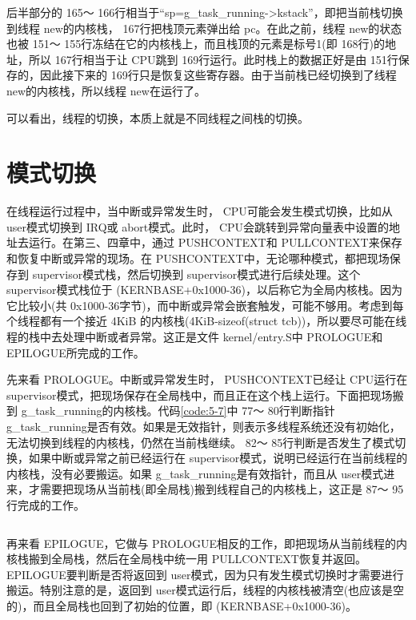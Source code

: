 \documentclass[main.tex]{subfiles}
\begin{document}
\begin{CJK*}{UTF8}{song}
后半部分的 165～ 166行相当于“sp=g\_\-task\_\-running-\textgreater kstack”，即把当前栈切换到线程 new的内核栈， 167行把栈顶元素弹出给 pc。在此之前，线程 new的状态也被 151～ 155行冻结在它的内核栈上，而且栈顶的元素是标号1(即 168行)的地址，所以 167行相当于让 CPU跳到 169行运行。此时栈上的数据正好是由 151行保存的，因此接下来的 169行只是恢复这些寄存器。由于当前栈已经切换到了线程 new的内核栈，所以线程 new在运行了。

\par
可以看出，线程的切换，本质上就是不同线程之间栈的切换。

\section{模式切换}
在线程运行过程中，当中断或异常发生时， CPU可能会发生模式切换，比如从 user模式切换到 IRQ或 abort模式。此时， CPU会跳转到异常向量表中设置的地址去运行。在第三、四章中，通过 PUSH\-CONTEXT和  PULL\-CONTEXT来保存和恢复中断或异常的现场。在 PUSH\-CONTEXT中，无论哪种模式，都把现场保存到 supervisor模式栈，然后切换到 supervisor模式进行后续处理。这个 supervisor模式栈位于 (KERN\-BASE+0x1000-36)，以后称它为全局内核栈。因为它比较小(共 0x1000-36字节)，而中断或异常会嵌套触发，可能不够用。考虑到每个线程都有一个接近 4\-KiB 的内核栈(4\-KiB-sizeof(struct tcb))，所以要尽可能在线程的栈中去处理中断或者异常。这正是文件 kernel\-/\-entry.S中 PROLOGUE和 EPILOGUE所完成的工作。

\par
先来看 PROLOGUE。中断或异常发生时， PUSH\-CONTEXT已经让 CPU运行在 supervisor模式，把现场保存在全局栈中，而且正在这个栈上运行。下面把现场搬到  g\_\-task\_\-running的内核栈。代码\ref{code:5-7}中 77～ 80行判断指针   g\_\-task\_\-running是否有效。如果是无效指针，则表示多线程系统还没有初始化，无法切换到线程的内核栈，仍然在当前栈继续。 82～ 85行判断是否发生了模式切换，如果中断或异常之前已经运行在 supervisor模式，说明已经运行在当前线程的内核栈，没有必要搬运。如果  g\_\-task\_\-running是有效指针，而且从 user模式进来，才需要把现场从当前栈(即全局栈)搬到线程自己的内核栈上，这正是 87～ 95行完成的工作。

\begin{code}
\label{code:5-7}
\inputminted[firstline=76,lastline=97,linenos,numbersep=5pt,frame=lines,framesep=2mm]{gas}{src/chapter05/kernel/entry.S}
\end{code}

\par
再来看 EPILOGUE，它做与 PROLOGUE相反的工作，即把现场从当前线程的内核栈搬到全局栈，然后在全局栈中统一用 PULL\-CONTEXT恢复并返回。 EPILOGUE要判断是否将返回到 user模式，因为只有发生模式切换时才需要进行搬运。特别注意的是，返回到 user模式运行后，线程的内核栈被清空(也应该是空的)，而且全局栈也回到了初始的位置，即 (KERN\-BASE+0x1000-36)。


\end{CJK*}
\end{document}
